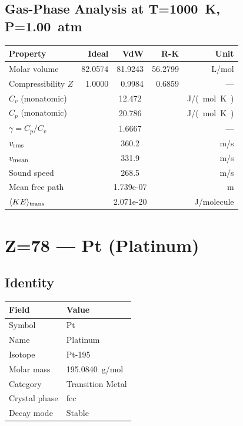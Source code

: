 \documentclass[11pt,a4paper]{article}
\begin{document}
\subsection{Gas-Phase Analysis at T=\SI{1000}{K}, P=\SI{1.00}{atm}}
\begin{tabular}{lrrrr}
  \toprule
  Property & Ideal & VdW & R-K & Unit \\
  \midrule
  Molar volume & 82.0574 & 81.9243 & 56.2799 & \si{L/mol} \\
  Compressibility $Z$ & 1.0000 & 0.9984 & 0.6859 & --- \\
  \midrule
  $C_v$ (monatomic) & \multicolumn{3}{c}{12.472} & \si{J/(mol.K)} \\
  $C_p$ (monatomic) & \multicolumn{3}{c}{20.786} & \si{J/(mol.K)} \\
  $\gamma = C_p/C_v$ & \multicolumn{3}{c}{1.6667} & --- \\
  $v_{\rm rms}$ & \multicolumn{3}{c}{360.2} & \si{m/s} \\
  $v_{\rm mean}$ & \multicolumn{3}{c}{331.9} & \si{m/s} \\
  Sound speed & \multicolumn{3}{c}{268.5} & \si{m/s} \\
  Mean free path & \multicolumn{3}{c}{1.739e-07} & \si{m} \\
  $\langle KE \rangle_{\rm trans}$ & \multicolumn{3}{c}{2.071e-20} & \si{J/molecule} \\
  \bottomrule
\end{tabular}

\newpage

\section{Z=78 --- Pt (Platinum)}
\label{sec:Z78}

\subsection{Identity}
\begin{tabular}{ll}
  \toprule
  Field & Value \\
  \midrule
  Symbol & Pt \\
  Name & Platinum \\
  Isotope & Pt-195 \\
  Molar mass & \SI{195.0840}{g/mol} \\
  Category & Transition Metal \\
  Crystal phase & fcc \\
  Decay mode & Stable \\
  \bottomrule
\end{tabular}
\end{document}
